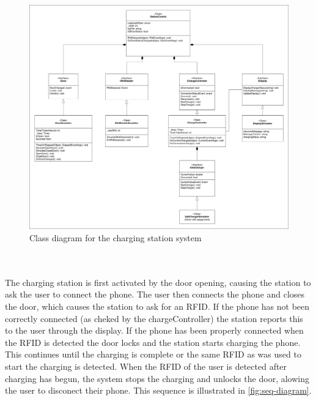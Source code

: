\begin{figure}[h]
  \centering
  \includegraphics[width=\textwidth]{02-Body/images/ChargingStation_classDiagram.pdf}
  \caption{Class diagram for the charging station system}
  \label{fig:class-diagram}
\end{figure}
\\
\\
The charging station is first activated by the door opening, causing the station to ask the user to connect the phone. The user then connects the phone and closes the door, which causes the station to ask for an RFID. If the phone has not been correctly connected (as cheked by the chargeController) the station reports this to the user through the display. If the phone has been properly connected when the RFID is detected the door locks and the station starts charging the phone. This continues until the charging is complete or the same RFID as was used to start the charging is detected. When the RFID of the user is detected after charging has begun, the system stops the charging and unlocks the door, alowing the user to disconect their phone.
This sequence is illustrated in \autoref{fig:seq-diagram}.

